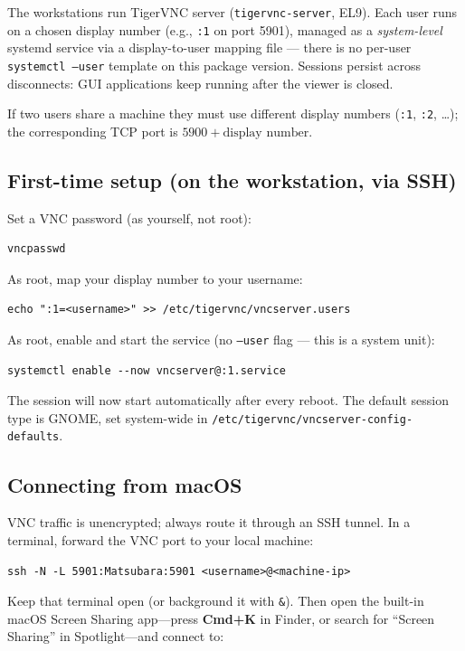 \documentclass[11pt]{article}
\begin{document}
The workstations run TigerVNC server (\texttt{tigervnc-server}, EL9). Each user
runs on a chosen display number (e.g., \texttt{:1} on port 5901), managed as a
\emph{system-level} systemd service via a display-to-user mapping file --- there
is no per-user \texttt{systemctl --user} template on this package version.
Sessions persist across disconnects: GUI applications keep running after the
viewer is closed.

If two users share a machine they must use different display numbers
(\texttt{:1}, \texttt{:2}, \ldots); the corresponding TCP port is
$5900 + \text{display number}$.

\subsection*{First-time setup (on the workstation, via SSH)}

Set a VNC password (as yourself, not root):
\begin{verbatim}
vncpasswd
\end{verbatim}

As root, map your display number to your username:
\begin{verbatim}
echo ":1=<username>" >> /etc/tigervnc/vncserver.users
\end{verbatim}

As root, enable and start the service (no \texttt{--user} flag --- this is a
system unit):
\begin{verbatim}
systemctl enable --now vncserver@:1.service
\end{verbatim}

The session will now start automatically after every reboot. The default
session type is GNOME, set system-wide in
\texttt{/etc/tigervnc/vncserver-config-defaults}.

\subsection*{Connecting from macOS}

VNC traffic is unencrypted; always route it through an SSH tunnel.  In a
terminal, forward the VNC port to your local machine:

\begin{verbatim}
ssh -N -L 5901:Matsubara:5901 <username>@<machine-ip>
\end{verbatim}

Keep that terminal open (or background it with \texttt{\&}).  Then open the
built-in macOS Screen Sharing app---press \textbf{Cmd+K} in Finder, or
search for ``Screen Sharing'' in Spotlight---and connect to:
\end{document}

